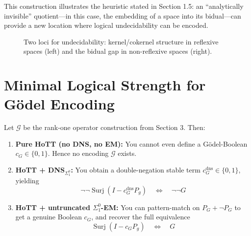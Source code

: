 \documentclass[11pt]{article}
\theoremstyle{definition}
\newcommand{\SigOne}{\Sigma^{0}_{\!1}}
\DeclareMathOperator{\Surj}{Surj}
\begin{document}
This construction illustrates the heuristic stated in Section 1.5: an ``analytically invisible'' quotient---in this case, the embedding of a space into its bidual---can provide a new location where logical undecidability can be encoded.

\begin{figure}[!ht]
\centering
{}
\caption{Two loci for undecidability: kernel/cokernel structure in reflexive spaces (left) and the bidual gap in non-reflexive spaces (right).}
\label{fig:two_gaps}
\end{figure}

\section{Minimal Logical Strength for Gödel Encoding}
\label{sec:persistence}

Let $\mathcal{G}$ be the rank-one operator construction from Section 3. Then:

\begin{enumerate}
\item \textbf{Pure HoTT (no DNS, no EM):} You cannot even define a Gödel-Boolean $c_G \in \{0,1\}$. Hence no encoding $\mathcal{G}$ exists.

\item \textbf{HoTT + DNS$_{\SigOne}$:} You obtain a double-negation stable term $c_G^{\text{dns}} \in \{0,1\}$, yielding
\[
\neg\neg\Surj(I - c_G^{\text{dns}}P_g) \quad\Longleftrightarrow\quad \neg\neg G
\]

\item \textbf{HoTT + untruncated $\SigOne$-EM:} You can pattern-match on $P_G + \neg P_G$ to get a genuine Boolean $c_G$, and recover the full equivalence
\[
\Surj(I - c_G P_g) \quad\Longleftrightarrow\quad G
\]
\end{enumerate}
\end{document}
